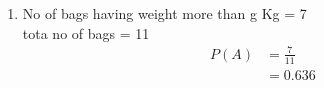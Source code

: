 \renewcommand{\theequation}{\theenumi}
\begin{enumerate}[label=\arabic*.,ref=\thesubsection.\theenumi]
\item No of bags having weight more than g Kg = 7
\\
tota no of bags = 11
\begin{align}
P\left(A\right) &= \frac{7}{11}
\\
&=0.636
\end{align}
\end{enumerate}
